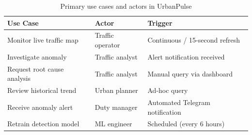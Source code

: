   \begin{table}[h]
  \centering                                                                                                                                              
  \caption{Primary use cases and actors in UrbanPulse}
  \label{tab:use_cases}
  \begin{tabular}{lll}                                                                                                                                    
  \hline
  \textbf{Use Case} & \textbf{Actor} & \textbf{Trigger} \\                                                                                                
  \hline          
  Monitor live traffic map      & Traffic operator  & Continuous / 15-second refresh \\                                                                   
  Investigate anomaly           & Traffic analyst   & Alert notification received \\
  Request root cause analysis   & Traffic analyst   & Manual query via dashboard \\                                                                       
  Review historical trend       & Urban planner     & Ad-hoc query \\                                                                                     
  Receive anomaly alert         & Duty manager      & Automated Telegram notification \\                                                                  
  Retrain detection model       & ML engineer       & Scheduled (every 6 hours) \\                                                                        
  \hline                                                                                                                                                  
  \end{tabular}                                                                                                                                           
  \end{table}                                                                                                                                             
                                                                                                                                                          
